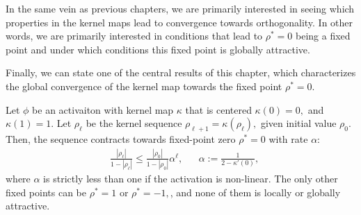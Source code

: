 In the same vein as previous chapters, we are primarily interested in seeing which properties in the kernel maps lead to convergence towards orthogonality. In other words, we are primarily interested in conditions that lead to $\rho^*=0$ being a fixed point and under which conditions this fixed point is globally attractive. 








Finally, we can state one of the central results of this chapter, which characterizes the global convergence of the kernel map towards the fixed point $\rho^*=0.$

\begin{theorem}\label{iso:thm:global_attract}
Let $\phi$ be an activaiton with kernel map $\kappa$ that is centered $\kappa(0)=0,$ and $\kappa(1)=1.$ Let $\rho_\ell$ be the kernel sequence $\rho_{\ell+1}=\kappa(\rho_\ell),$ given initial value $\rho_0.$ Then, the sequence contracts towards fixed-point zero $\rho^*=0$ with rate $\alpha$:
    \begin{align}
        &\frac{|\rho_\ell|}{1-|\rho_\ell|} \le \frac{|\rho_0|}{1-|\rho_0|}\alpha^{\ell}, && \alpha := \frac{1}{2-\kappa'(0)},
    \end{align}
 where $\alpha$ is strictly less than one if the activation is non-linear. The only other fixed points can be $\rho^*=1$ or $\rho^*=-1,$, and none of them is locally or globally attractive.
\end{theorem}

